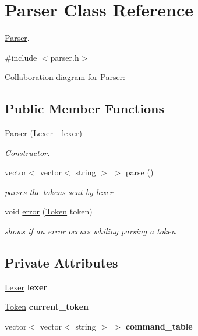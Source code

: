 \hypertarget{classParser}{}\section{Parser Class Reference}
\label{classParser}


\hyperlink{classParser}{Parser}.  




{\ttfamily \#include $<$parser.\+h$>$}



Collaboration diagram for Parser\+:
\subsection*{Public Member Functions}
\begin{DoxyCompactItemize}
\item 
\hyperlink{classParser_a289221b33b089e362efbbbcbe04a7742}{Parser} (\hyperlink{classLexer}{Lexer} \+\_\+lexer)
\begin{DoxyCompactList}\small\item\em Constructor. \end{DoxyCompactList}\item 
vector$<$ vector$<$ string $>$ $>$ \hyperlink{classParser_a55130c5736af44f0f85d9ff3bcdb4540}{parse} ()
\begin{DoxyCompactList}\small\item\em parses the tokens sent by lexer \end{DoxyCompactList}\item 
void \hyperlink{classParser_ab1e737791bb884b3111e408a1235bf83}{error} (\hyperlink{classToken}{Token} token)
\begin{DoxyCompactList}\small\item\em shows if an error occurs whiling parsing a token \end{DoxyCompactList}\end{DoxyCompactItemize}
\subsection*{Private Attributes}
\begin{DoxyCompactItemize}
\item 
\hyperlink{classLexer}{Lexer} {\bfseries lexer}\hypertarget{classParser_aad05518621c5340d31f2b986a6467584}{}\label{classParser_aad05518621c5340d31f2b986a6467584}

\item 
\hyperlink{classToken}{Token} {\bfseries current\+\_\+token}\hypertarget{classParser_a21ea3fca7b244f80d61baa44d145d3c6}{}\label{classParser_a21ea3fca7b244f80d61baa44d145d3c6}

\item 
vector$<$ vector$<$ string $>$ $>$ {\bfseries command\+\_\+table}\hypertarget{classParser_a8668c518b4322510223fe4ddc01400a6}{}\label{classParser_a8668c518b4322510223fe4ddc01400a6}

\end{DoxyCompactItemize}


